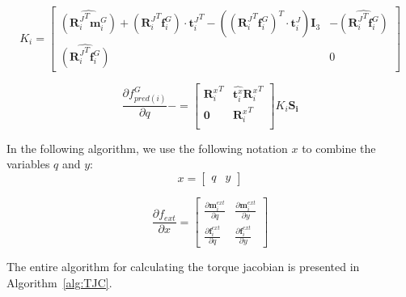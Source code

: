 \begin{equation}
  K_i =
  \begin{bmatrix}
    \widehat{({\mathbf{R}_i^J}^T \mathbf{m}^{G}_i)}
    + \left({\mathbf{R}_i^J}^T \mathbf{f}^{G}_i\right) \cdot {\mathbf{t}^J_i}^T
    - \left( {({\mathbf{R}_i^J}^T \mathbf{f}^{G}_i)}^T \cdot \mathbf{t}^J_i\right) \mathbf{I}_3
    & -\widehat{({\mathbf{R}_i^J}^T \mathbf{f}^{G}_i)} \\
    \widehat{({\mathbf{R}_i^J}^T \mathbf{f}^{G}_i)} & 0
  \end{bmatrix}
\end{equation}

\begin{equation}
  \frac{\partial f^G_{pred(i)}}{\partial q} -=
  \begin{bmatrix}
    {\mathbf{R}^{x}_i}^T & \widehat{\mathbf{t}^{x}_i}{\mathbf{R}^{x}_i}^T \\
    \mathbf{0} & {\mathbf{R}^{x}_i}^T \\
  \end{bmatrix}
  K_i \mathbf{S_i}
\end{equation}

In the following algorithm, we use the following notation $x$ to combine the variables $q$ and $y$:
\begin{equation}
  x = \begin{bmatrix}
    q & y
  \end{bmatrix}
\end{equation}

\begin{equation}
  \frac{\partial f_{ext}}{\partial x} =
  \begin{bmatrix}
    \frac{\partial \mathbf{m}^{ext}_i}{\partial q} & \frac{\partial \mathbf{m}^{ext}_i}{\partial y}
    \\
    \frac{\partial \mathbf{f}^{ext}_i}{\partial q} & \frac{\partial \mathbf{f}^{ext}_i}{\partial y}
  \end{bmatrix}
\end{equation}


The entire algorithm for calculating the torque jacobian is presented in Algorithm~\ref{alg:TJC}.

